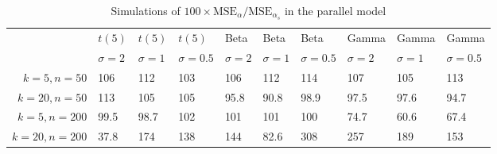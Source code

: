 \begin{table}[ht]
\centering
\caption{Simulations of $100 \times \textrm{MSE}_\alpha/\textrm{MSE}_{\alpha_s}$ in the parallel model} 
\begin{tabular}{rlllllllll}
    & $t(5)$ & $t(5)$ & $t(5)$ & Beta & Beta & Beta & Gamma & Gamma & Gamma \\
  & $\sigma = 2$ & $\sigma = 1$ & $\sigma = 0.5$ & $\sigma = 2$ & $\sigma = 1$ & $\sigma = 0.5$ & $\sigma = 2$ & $\sigma = 1$ & $\sigma = 0.5$ \\
$k = 5, n = 50$ & 106 & 112 & 103 & 106 & 112 & 114 & 107 & 105 & 113 \\ 
  $k = 20, n = 50$ & 113 & 105 & 105 & 95.8 & 90.8 & 98.9 & 97.5 & 97.6 & 94.7 \\ 
  $k = 5, n = 200$ & 99.5 & 98.7 & 102 & 101 & 101 & 100 & 74.7 & 60.6 & 67.4 \\ 
  $k = 20, n = 200$ & 37.8 & 174 & 138 & 144 & 82.6 & 308 & 257 & 189 & 153 \\ 
  \end{tabular}
\end{table}
\newcommand{\geomean}{1.08}

